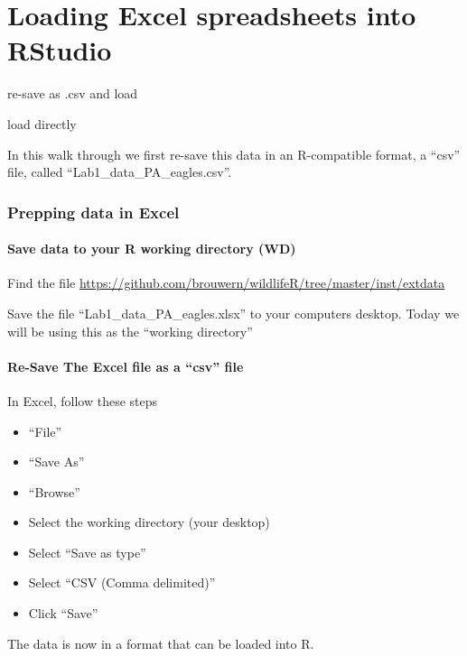 \documentclass[]{book}
\providecommand{\tightlist}{%
  \setlength{\itemsep}{0pt}\setlength{\parskip}{0pt}}
\theoremstyle{definition}
\theoremstyle{definition}
\theoremstyle{definition}
\theoremstyle{remark}
\begin{document}
\chapter{Loading Excel spreadsheets into
RStudio}\label{loading-excel-spreadsheets-into-rstudio}

re-save as .csv and load

load directly

In this walk through we first re-save this data in an R-compatible
format, a ``csv'' file, called ``Lab1\_data\_PA\_eagles.csv''.

\subsection{Prepping data in Excel}\label{prepping-data-in-excel}

\subsubsection{Save data to your R working directory
(WD)}\label{save-data-to-your-r-working-directory-wd}

Find the file
\url{https://github.com/brouwern/wildlifeR/tree/master/inst/extdata}

Save the file ``Lab1\_data\_PA\_eagles.xlsx'' to your computers desktop.
Today we will be using this as the ``working directory''

\subsubsection{\texorpdfstring{Re-Save The Excel file as a ``csv''
file}{Re-Save The Excel file as a csv file}}\label{re-save-the-excel-file-as-a-csv-file}

In Excel, follow these steps

\begin{itemize}
\tightlist
\item
  ``File''
\item
  ``Save As''
\item
  ``Browse''
\item
  Select the working directory (your desktop)
\item
  Select ``Save as type''
\item
  Select ``CSV (Comma delimited)''
\item
  Click ``Save''
\end{itemize}

The data is now in a format that can be loaded into R.
\end{document}
